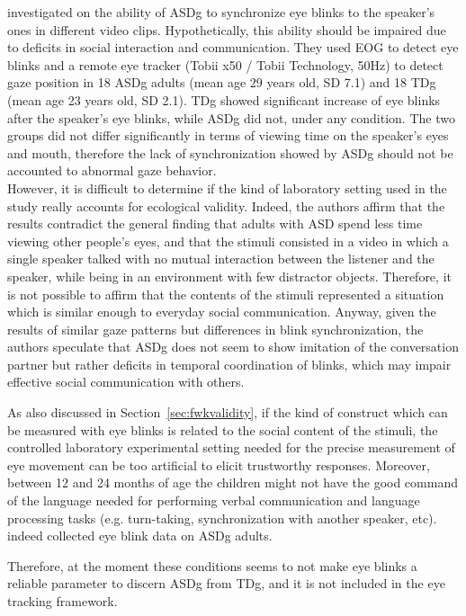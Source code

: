 \cite{nakan02011blinks} investigated on the ability of ASDg to synchronize eye blinks to the speaker’s ones in different video clips. Hypothetically, this ability should be impaired due to deficits in social interaction and communication. They used EOG to detect eye blinks and a remote eye tracker (Tobii x50 / Tobii Technology, 50Hz) to detect gaze position in 18 ASDg adults (mean age 29 years old, SD 7.1) and 18 TDg (mean age 23 years old, SD 2.1). TDg showed significant increase of eye blinks after the speaker’s eye blinks, while ASDg did not, under any condition. The two groups did not differ significantly in terms of viewing time on the speaker’s eyes and mouth, therefore the lack of synchronization showed by ASDg should not be accounted to abnormal gaze behavior.\\
However, it is difficult to determine if the kind of laboratory setting used in the study really accounts for ecological validity. Indeed, the authors affirm that the results contradict the general finding that adults with ASD spend less time viewing other people’s eyes, and that the stimuli consisted in a video in which a single speaker talked with no mutual interaction between the listener and the speaker, while being in an environment with few distractor objects. Therefore, it is not possible to affirm that the contents of the stimuli represented a situation which is similar enough to everyday social communication. Anyway, given the results of similar gaze patterns but differences in blink synchronization, the authors speculate that ASDg does not seem to show imitation of the conversation partner but rather deficits in temporal coordination of blinks, which may impair effective social communication with others.

As also discussed in Section~\ref{sec:fwkvalidity}, if the kind of construct which can be measured with eye blinks is related to the social content of the stimuli, the controlled laboratory experimental setting needed for the precise measurement of eye movement can be too artificial to elicit trustworthy responses. Moreover, between 12 and 24 months of age the children might not have the good command of the language needed for performing verbal communication and language processing tasks (e.g. turn-taking, synchronization with another speaker, etc). \cite{nakan02011blinks} indeed collected eye blink data on ASDg adults.

Therefore, at the moment these conditions seems to not make eye blinks a reliable parameter to discern ASDg from TDg, and it is not included in the eye tracking framework.
